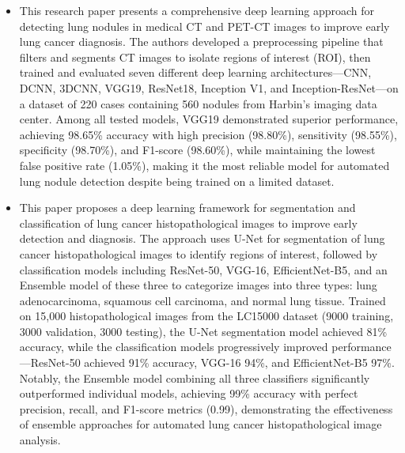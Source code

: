 \begin{itemize}
	\item This research paper presents a comprehensive deep learning approach for detecting lung nodules in medical CT and PET-CT images to improve early lung cancer diagnosis. The authors developed a preprocessing pipeline that filters and segments CT images to isolate regions of interest (ROI), then trained and evaluated seven different deep learning architectures—CNN, DCNN, 3DCNN, VGG19, ResNet18, Inception V1, and Inception-ResNet—on a dataset of 220 cases containing 560 nodules from Harbin's imaging data center. Among all tested models, VGG19 demonstrated superior performance, achieving 98.65\% accuracy with high precision (98.80\%), sensitivity (98.55\%), specificity (98.70\%), and F1-score (98.60\%), while maintaining the lowest false positive rate (1.05\%), making it the most reliable model for automated lung nodule detection despite being trained on a limited dataset. \cite{article3}
	\item This paper proposes a deep learning framework for segmentation and classification of lung cancer histopathological images to improve early detection and diagnosis. The approach uses U-Net for segmentation of lung cancer histopathological images to identify regions of interest, followed by classification models including ResNet-50, VGG-16, EfficientNet-B5, and an Ensemble model of these three to categorize images into three types: lung adenocarcinoma, squamous cell carcinoma, and normal lung tissue. Trained on 15,000 histopathological images from the LC15000 dataset (9000 training, 3000 validation, 3000 testing), the U-Net segmentation model achieved 81\% accuracy, while the classification models progressively improved performance—ResNet-50 achieved 91\% accuracy, VGG-16 94\%, and EfficientNet-B5 97\%. Notably, the Ensemble model combining all three classifiers significantly outperformed individual models, achieving 99\% accuracy with perfect precision, recall, and F1-score metrics (0.99), demonstrating the effectiveness of ensemble approaches for automated lung cancer histopathological image analysis. \cite{KANAKARADDI20243226}

\end{itemize}
